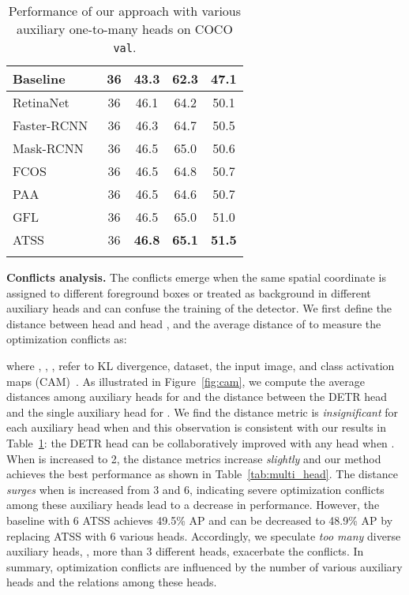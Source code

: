 \begin{table}[t]
{\begin{tabular}{l|c|c|c|c}
        \shline
        Baseline & 36 & 43.3 & 62.3 & 47.1 \\ 
        \hline
        RetinaNet~\cite{retina} & 36 & 46.1 & 64.2 & 50.1 \\
        Faster-RCNN~\cite{faster} & 36 & 46.3 & 64.7 & 50.5 \\
        Mask-RCNN~\cite{mask} & 36 & 46.5 & 65.0 & 50.6 \\
        FCOS~\cite{fcos} & 36 & 46.5 & 64.8 & 50.7 \\
        PAA~\cite{paa} & 36 & 46.5 & 64.6 & 50.7 \\
        GFL~\cite{gfl} & 36 & 46.5 & 65.0 & 51.0 \\
\cellcolor{gray!20}ATSS~\cite{atss} & \cellcolor{gray!20}36 & \cellcolor{gray!20}\textbf{46.8} & \cellcolor{gray!20}\textbf{65.1} & \cellcolor{gray!20}\textbf{51.5} \\
        \shline
        \end{tabular}
    }
    \vspace{-2mm}
    \caption{\small{Performance of our approach with various auxiliary one-to-many heads on COCO \texttt{val}.}
    }
    \label{tab:heads_ablation}
    \vspace{-3mm}
\end{table} 


\vspace{1mm}
\noindent\textbf{Conflicts analysis.} 
The conflicts emerge when the same spatial coordinate is assigned to different foreground boxes or treated as background in different auxiliary heads and can confuse the training of the detector. 
We first define the distance between head  and head , and the average distance of  to measure the optimization conflicts as:


where , , ,  refer to KL divergence, dataset, the input image, and class activation maps (CAM)~\cite{cam}. 
As illustrated in Figure~\ref{fig:cam}, we compute the average distances among auxiliary heads for  and the distance between the DETR head and the single auxiliary head for .
We find the distance metric is \textit{insignificant} for each auxiliary head when  and this observation is consistent with our results in Table~\ref{tab:heads_ablation}: the DETR head can be collaboratively improved with any head when .
When  is increased to 2, the distance metrics increase \textit{slightly} and our method achieves the best performance as shown in Table~\ref{tab:multi_head}.
The distance \textit{surges} when  is increased from 3 and 6, indicating severe optimization conflicts among these auxiliary heads lead to a decrease in performance. 
However, the baseline with 6 ATSS achieves 49.5\% AP and can be decreased to 48.9\% AP by replacing ATSS with 6 various heads. 
Accordingly, we speculate \textit{too many} diverse auxiliary heads, \eg, more than 3 different heads, exacerbate the conflicts.
In summary, optimization conflicts are influenced by the number of various auxiliary heads and the relations among these heads.

